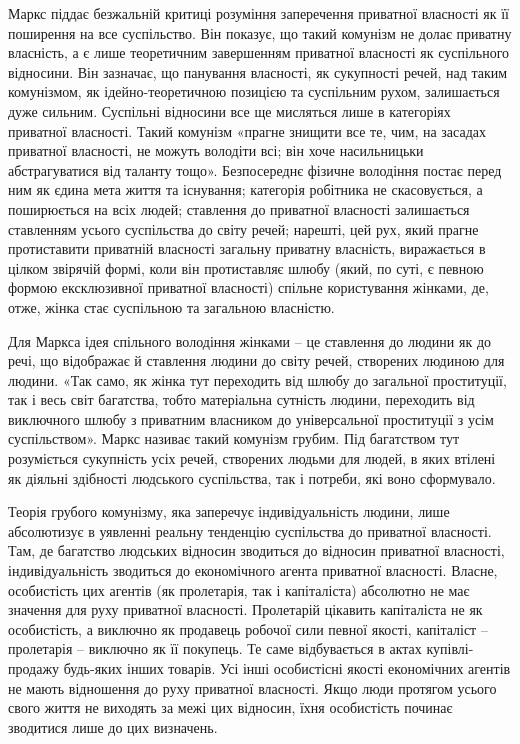 \documentclass[12pt,a4paper,openany]{book}
\begin{document}
Маркс піддає безжальній критиці розуміння заперечення приватної власності як її поширення на все суспільство. Він показує, що такий комунізм не долає приватну власність, а є лише теоретичним завершенням приватної власності як суспільного відносини. Він зазначає, що панування власності, як сукупності речей, над таким комунізмом, як ідейно-теоретичною позицією та суспільним рухом, залишається дуже сильним. Суспільні відносини все ще мисляться лише в категоріях приватної власності. Такий комунізм «прагне знищити все те, чим, на засадах приватної власності, не можуть володіти всі; він хоче насильницьки абстрагуватися від таланту тощо». Безпосереднє фізичне володіння постає перед ним як єдина мета життя та існування; категорія робітника не скасовується, а поширюється на всіх людей; ставлення до приватної власності залишається ставленням усього суспільства до світу речей; нарешті, цей рух, який прагне протиставити приватній власності загальну приватну власність, виражається в цілком звірячій формі, коли він протиставляє шлюбу (який, по суті, є певною формою ексклюзивної приватної власності) спільне користування жінками, де, отже, жінка стає суспільною та загальною власністю.

Для Маркса ідея спільного володіння жінками – це ставлення до людини як до речі, що відображає й ставлення людини до світу речей, створених людиною для людини. «Так само, як жінка тут переходить від шлюбу до загальної проституції, так і весь світ багатства, тобто матеріальна сутність людини, переходить від виключного шлюбу з приватним власником до універсальної проституції з усім суспільством». Маркс називає такий комунізм грубим. Під багатством тут розуміється сукупність усіх речей, створених людьми для людей, в яких втілені як діяльні здібності людського суспільства, так і потреби, які воно сформувало.

Теорія грубого комунізму, яка заперечує індивідуальність людини, лише абсолютизує в уявленні реальну тенденцію суспільства до приватної власності. Там, де багатство людських відносин зводиться до відносин приватної власності, індивідуальність зводиться до економічного агента приватної власності. Власне, особистість цих агентів (як пролетарія, так і капіталіста) абсолютно не має значення для руху приватної власності. Пролетарій цікавить капіталіста не як особистість, а виключно як продавець робочої сили певної якості, капіталіст – пролетарія – виключно як її покупець. Те саме відбувається в актах купівлі-продажу будь-яких інших товарів. Усі інші особистісні якості економічних агентів не мають відношення до руху приватної власності. Якщо люди протягом усього свого життя не виходять за межі цих відносин, їхня особистість починає зводитися лише до цих визначень.
\end{document}
